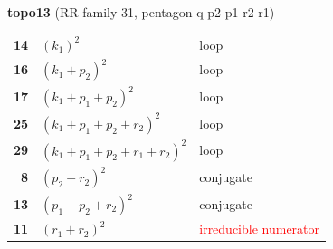 \documentclass[10pt]{article}
\begin{document}
\begin{minipage}[t]{0.48\textwidth}
{}\\[2mm]\textbf{topo13} (RR family 31, pentagon q-p2-p1-r2-r1)\\[2pt]{\footnotesize\begin{tabular}{@{}r@{\ \ }l@{\ \ }l@{}}\textbf{14} & $(k_1)^2$ & loop\\
\textbf{16} & $(k_1+p_2)^2$ & loop\\
\textbf{17} & $(k_1+p_1+p_2)^2$ & loop\\
\textbf{25} & $(k_1+p_1+p_2+r_2)^2$ & loop\\
\textbf{29} & $(k_1+p_1+p_2+r_1+r_2)^2$ & loop\\
\textbf{8} & $(p_2+r_2)^2$ & conjugate\\
\textbf{13} & $(p_1+p_2+r_2)^2$ & conjugate\\
\textbf{11} & $(r_1+r_2)^2$ & \textcolor{red}{irreducible numerator}\\\end{tabular}}\end{minipage}\hfill%
\end{document}
